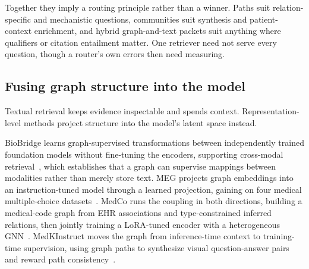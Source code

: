 Together they imply a routing principle rather than a winner. Paths suit relation-specific and mechanistic questions,  communities suit synthesis and patient-context enrichment, and hybrid graph-and-text packets suit anything where qualifiers or citation entailment matter. One retriever need not serve every question, though a router's own errors then need measuring.


\subsection{Fusing graph structure into the model}

Textual retrieval keeps evidence inspectable and spends context. Representation-level methods project structure into the model's latent space instead.

BioBridge learns graph-supervised transformations between independently trained foundation models without fine-tuning the encoders, supporting cross-modal retrieval~\cite{wang2024biobridge}, which establishes that a graph can supervise mappings between modalities rather than merely store text. MEG projects graph embeddings into an instruction-tuned model through a learned projection, gaining on four medical multiple-choice datasets~\cite{cabello2024meg}. MedCo runs the coupling in both directions, building a medical-code graph from EHR associations and type-constrained inferred relations, then jointly training a LoRA-tuned encoder with a heterogeneous GNN~\cite{kerdabadi2026medco}. MedKInstruct moves the graph from inference-time context to training-time supervision, using graph paths to synthesize visual question-answer pairs and reward path consistency~\cite{wu2026medkinstruct}.

